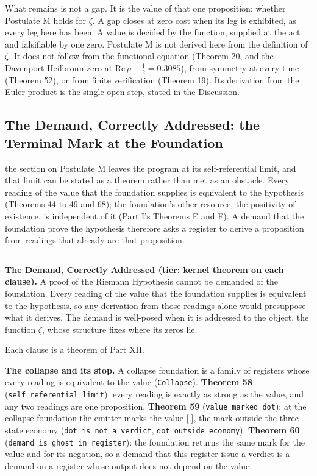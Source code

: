 \documentclass[10pt,twocolumn]{article}
\newcommand{\jboxstart}{\begin{jbox}}
\newcommand{\jboxend}{\end{jbox}}
\newenvironment{jbox}{\par\vspace{2pt}\noindent\color{accent}\rule{\columnwidth}{0.8pt}\par\vspace{-2pt}\small}{\par\vspace{2pt}}
\begin{document}
What remains is not a gap. It is the value of that one proposition:
whether Postulate M holds for \(\zeta\). A gap closes at zero cost when
its leg is exhibited, as every leg here has been. A value is decided by
the function, supplied at the act and falsifiable by one zero. Postulate
M is not derived here from the definition of \(\zeta\). It does not
follow from the functional equation (Theorem 20, and the
Davenport-Heilbronn zero at \(\mathrm{Re}\,\rho - \tfrac12 = 0.3085\)),
from symmetry at every time (Theorem 52), or from finite verification
(Theorem 19). Its derivation from the Euler product is the single open
step, stated in the Discussion.

\hypertarget{the-demand-correctly-addressed-the-terminal-mark-at-the-foundation}{%
\subsection{The Demand, Correctly Addressed: the Terminal Mark at the
Foundation}\label{the-demand-correctly-addressed-the-terminal-mark-at-the-foundation}}

the section on Postulate M leaves the program at its self-referential
limit, and that limit can be stated as a theorem rather than met as an
obstacle. Every reading of the value that the foundation supplies is
equivalent to the hypothesis (Theorems 44 to 49 and 68); the
foundation's other resource, the positivity of existence, is independent
of it (Part I's Theorems E and F). A demand that the foundation prove
the hypothesis therefore asks a register to derive a proposition from
readings that already are that proposition.

\jboxstart

\textbf{The Demand, Correctly Addressed (tier: kernel theorem on each
clause).} A proof of the Riemann Hypothesis cannot be demanded of the
foundation. Every reading of the value that the foundation supplies is
equivalent to the hypothesis, so any derivation from those readings
alone would presuppose what it derives. The demand is well-posed when it
is addressed to the object, the function \(\zeta\), whose structure
fixes where its zeros lie.

\jboxend

Each clause is a theorem of Part XII.

\textbf{The collapse and its stop.} A collapse foundation is a family of
registers whose every reading is equivalent to the value
(\texttt{Collapse}). \textbf{Theorem 58}
(\texttt{self\_referential\_limit}): every reading is exactly as strong
as the value, and any two readings are one proposition. \textbf{Theorem
59} (\texttt{value\_marked\_dot}): at the collapse foundation the
emitter marks the value {[}.{]}, the mark outside the three-state
economy (\texttt{dot\_is\_not\_a\_verdict},
\texttt{dot\_outside\_economy}). \textbf{Theorem 60}
(\texttt{demand\_is\_ghost\_in\_register}): the foundation returns the
same mark for the value and for its negation, so a demand that this
register issue a verdict is a demand on a register whose output does not
depend on the value.
\end{document}
